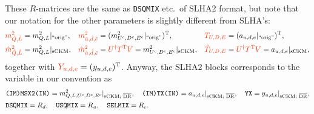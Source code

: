 \documentclass[CheatSheet]{subfiles}
\begin{document}
These $R$-matrices are the same as \texttt{DSQMIX} etc.\ of SLHA2 format, but
note that our notation for the other parameters is slightly different from SLHA's:
\begin{align}
 \C{m^2_{\tilde Q,\tilde L}} &=  m^2_{Q,L}|_\text{``orig''},&
 \C{m^2_{\tilde u,\tilde d,\tilde e}} &=  (m^2_{U^c,D^c,E^c}|_\text{``orig''})^\TT,&
 \C{T_{U,D,E}} &= (a_{u,d,e}|_\text{``orig''})^\TT,
\\
 \C{\hat m^2_{\tilde Q,\tilde L}} &=  m^2_{Q,L}|_\text{sCKM},&
 \C{\hat m^2_{\tilde u,\tilde d,\tilde e}} &=
 \C{U^\dagger T^\TT V} = m^2_{U^c,D^c,E^c}|_\text{sCKM},&
 \C{\hat T_{U,D,E}} &= \C{U^\dagger T^\TT V} = a_{u,d,e}|\w{sCKM},
\end{align}
together with $\C{Y_{u,d,e}} = (y_{u,d,e})^\TT$.
Anyway, the SLHA2 blocks corresponds to the variable in our convention as
\begin{align}
&  \texttt{(IM)MSX2(IN)} = m^2_{Q, L, U^\cc, D^\cc, E^\cc}|\w*{sCKM; $\overline{\mathrm{DR}}$},
\quad
  \texttt{(IM)TX(IN)} =  a_{u,d,e}|\w*{sCKM; $\overline{\mathrm{DR}}$},
\quad
  \texttt{YX} =  y_{u,d,e}|\w*{sCKM; $\overline{\mathrm{DR}}$},\\
&
\texttt{DSQMIX} = R_d,
\quad
\texttt{USQMIX} = R_u,
\quad
\texttt{SELMIX} = R_e.
\end{align}
\end{document}
